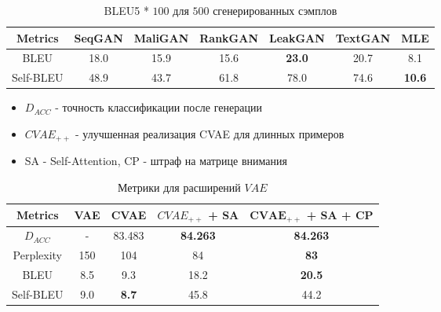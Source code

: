 \documentclass[10pt]{beamer}
\begin{document}
\begin{frame}

\begin{table}[H]
\begin{tabular}{c | c c c c c c}
\toprule
Metrics & SeqGAN & MaliGAN & RankGAN & LeakGAN & TextGAN & MLE \\
\midrule
BLEU & 18.0 & 15.9 & 15.6 & \textbf{23.0} & 20.7 & 8.1 \\
Self-BLEU & 48.9 & 43.7 & 61.8 & 78.0 & 74.6 & \textbf{10.6} \\
\bottomrule
\end{tabular}
\caption{BLEU5 * $100$ для $500$ сгенерированных сэмплов}\label{table:a}
\end{table}

\vskip-3mm

\begin{itemize}
    \item $D_{ACC}$ - точность классификации после генерации
    \item $CVAE_{++}$ - улучшенная реализация CVAE для длинных примеров
    \item SA - Self-Attention, CP - штраф на матрице внимания
\end{itemize}

\begin{table}[H]
\begin{tabular}{c | c c c c}
\toprule
Metrics & VAE & CVAE & $CVAE_{++}$ + SA & \textbf{$\boldsymbol{CVAE_{++}}$ + SA + CP} \\
\midrule
$D_{ACC}$ & - & 83.483 & \textbf{84.263} & \textbf{84.263} \\
Perplexity & 150 & 104 & 84 & \textbf{83} \\
BLEU & 8.5 & 9.3 & 18.2 & \textbf{20.5} \\
Self-BLEU & 9.0 & \textbf{8.7} & 45.8 & 44.2 \\
\bottomrule
\end{tabular}
\caption{Метрики для расширений $VAE$}\label{table:b}
\end{table}

\end{frame}
\end{document}
